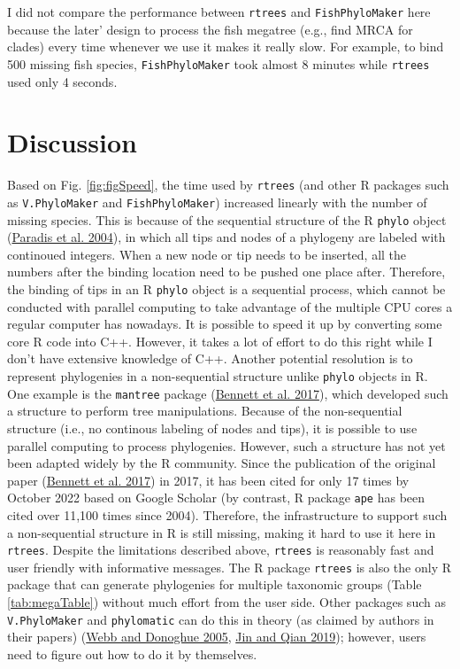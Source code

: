 \documentclass[
  12pt,
]{article}
\begin{document}
I did not compare the performance between \texttt{rtrees} and \texttt{FishPhyloMaker} here because the later' design to process the fish megatree (e.g., find MRCA for clades) every time whenever we use it makes it really slow. For example, to bind 500 missing fish species, \texttt{FishPhyloMaker} took almost 8 minutes while \texttt{rtrees} used only 4 seconds.

\hypertarget{discussion}{%
\section{Discussion}\label{discussion}}

Based on Fig. \ref{fig:figSpeed}, the time used by \texttt{rtrees} (and other R packages such as \texttt{V.PhyloMaker} and \texttt{FishPhyloMaker}) increased linearly with the number of missing species. This is because of the sequential structure of the R \texttt{phylo} object (\protect\hyperlink{ref-paradis2004ape}{Paradis et al. 2004}), in which all tips and nodes of a phylogeny are labeled with continoued integers. When a new node or tip needs to be inserted, all the numbers after the binding location need to be pushed one place after. Therefore, the binding of tips in an R \texttt{phylo} object is a sequential process, which cannot be conducted with parallel computing to take advantage of the multiple CPU cores a regular computer has nowadays. It is possible to speed it up by converting some core R code into C++. However, it takes a lot of effort to do this right while I don't have extensive knowledge of C++. Another potential resolution is to represent phylogenies in a non-sequential structure unlike \texttt{phylo} objects in R. One example is the \texttt{mantree} package (\protect\hyperlink{ref-bennett2017treeman}{Bennett et al. 2017}), which developed such a structure to perform tree manipulations. Because of the non-sequential structure (i.e., no continous labeling of nodes and tips), it is possible to use parallel computing to process phylogenies. However, such a structure has not yet been adapted widely by the R community. Since the publication of the original paper (\protect\hyperlink{ref-bennett2017treeman}{Bennett et al. 2017}) in 2017, it has been cited for only 17 times by October 2022 based on Google Scholar (by contrast, R package \texttt{ape} has been cited over 11,100 times since 2004). Therefore, the infrastructure to support such a non-sequential structure in R is still missing, making it hard to use it here in \texttt{rtrees}. Despite the limitations described above, \texttt{rtrees} is reasonably fast and user friendly with informative messages. The R package \texttt{rtrees} is also the only R package that can generate phylogenies for multiple taxonomic groups (Table \ref{tab:megaTable}) without much effort from the user side. Other packages such as \texttt{V.PhyloMaker} and \texttt{phylomatic} can do this in theory (as claimed by authors in their papers) (\protect\hyperlink{ref-webb2005phylomatic}{Webb and Donoghue 2005}, \protect\hyperlink{ref-jin2019v}{Jin and Qian 2019}); however, users need to figure out how to do it by themselves.
\end{document}
